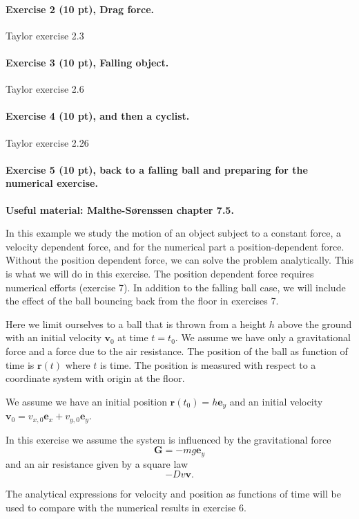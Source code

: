 \documentclass[%
oneside,                 %
final,                   %
10pt]{article}
\begin{document}
\noindent
\paragraph{Exercise 2 (10 pt), Drag force.}
Taylor exercise 2.3

\paragraph{Exercise 3 (10 pt), Falling object.}
Taylor exercise 2.6

\paragraph{Exercise 4 (10 pt), and then a cyclist.}
Taylor exercise 2.26


\paragraph{Exercise 5 (10 pt), back to a falling ball and preparing for the numerical exercise.}
\textbf{Useful material: Malthe-Sørenssen chapter 7.5.}

In this example we study the motion of an object subject to a constant force, a velocity dependent
force, and for the numerical part a position-dependent force.
Without the position dependent force, we can solve the problem analytically. This is what we will do in this exercise.
The position dependent force requires numerical efforts (exercise 7).
In addition to the  falling ball case, we will include the effect of the ball bouncing back from the floor in exercises 7.


Here we limit ourselves to a ball that is thrown from a height $h$
above the ground with an initial velocity
$\bm{v}_0$ at time $t=t_0$.
We assume we have only a gravitational force and a force due to the air resistance.
The position of the ball as function of time is  $\bm{r}(t)$ where $t$ is time.
 The position is measured with respect to a coordinate system with origin at the floor.

We assume we have an initial position $\bm{r}(t_0)=h\bm{e}_y$ and an initial velocity $\bm{v}_0=v_{x,0}\bm{e}_x+v_{y,0}\bm{e}_y$.

In this exercise we assume the system is influenced by the gravitational force
\[
\bm{G}=-mg\bm{e}_y
\]
and an air resistance given by a square law
\[
-Dv\bm{v}.
\]

The analytical expressions for velocity and position as functions of
time will be used to compare with the numerical results in exercise 6.
\end{document}
